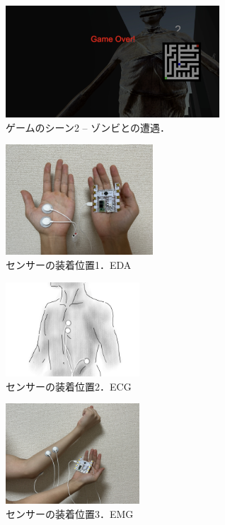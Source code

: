 \documentclass[a4paper]{jarticle}
\begin{document}
\begin{figure}[tp]
  \begin{center}
    \includegraphics*[width=80mm]{game2.png}
  \end{center}
  \vspace*{-6mm}
  \caption{ゲームのシーン2 -- ゾンビとの遭遇．}
  \label{figure2}
\end{figure}

\begin{figure}[tp]
  \begin{center}
    \includegraphics*[width=55mm]{figure3_eda.jpg}
  \end{center}
  \caption{センサーの装着位置1．EDA}
  \label{figure3}
\end{figure}

\begin{figure}[tp]
  \begin{center}
    \includegraphics*[width=50mm]{figure4_ecg.png}
  \end{center}
  \vspace*{-6mm}
  \caption{センサーの装着位置2．ECG}
  \label{figure4}
\end{figure}

\begin{figure}[tp]
  \begin{center}
    \includegraphics*[width=50mm]{figure5_emg.jpg}
  \end{center}
  \caption{センサーの装着位置3．EMG}
  \label{figure5}
\end{figure}
\end{document}
